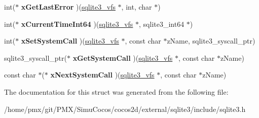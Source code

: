 \begin{DoxyCompactItemize}
int($\ast$ {\bfseries x\+Get\+Last\+Error} )(\hyperlink{structsqlite3__vfs}{sqlite3\+\_\+vfs} $\ast$, int, char $\ast$)
\item 
\mbox{\label{structsqlite3__vfs_aa281584c422969b7f0df0e5f918fc590}} 
int($\ast$ {\bfseries x\+Current\+Time\+Int64} )(\hyperlink{structsqlite3__vfs}{sqlite3\+\_\+vfs} $\ast$, sqlite3\+\_\+int64 $\ast$)
\item 
\mbox{\label{structsqlite3__vfs_a69996d40229d6eabe6869bb3fc80b730}} 
int($\ast$ {\bfseries x\+Set\+System\+Call} )(\hyperlink{structsqlite3__vfs}{sqlite3\+\_\+vfs} $\ast$, const char $\ast$z\+Name, sqlite3\+\_\+syscall\+\_\+ptr)
\item 
\mbox{\label{structsqlite3__vfs_a604384e58c645e06b6db38d8a45e1103}} 
sqlite3\+\_\+syscall\+\_\+ptr($\ast$ {\bfseries x\+Get\+System\+Call} )(\hyperlink{structsqlite3__vfs}{sqlite3\+\_\+vfs} $\ast$, const char $\ast$z\+Name)
\item 
\mbox{\label{structsqlite3__vfs_ac2930d34749977f39b1bbc27dc1de2b2}} 
const char $\ast$($\ast$ {\bfseries x\+Next\+System\+Call} )(\hyperlink{structsqlite3__vfs}{sqlite3\+\_\+vfs} $\ast$, const char $\ast$z\+Name)
\end{DoxyCompactItemize}


The documentation for this struct was generated from the following file\+:\begin{DoxyCompactItemize}
\item 
/home/pmx/git/\+P\+M\+X/\+Simu\+Cocos/cocos2d/external/sqlite3/include/sqlite3.\+h\end{DoxyCompactItemize}

